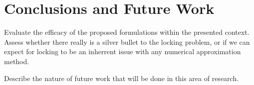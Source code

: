 \chapter{Conclusions and Future Work} \label{ch:future_work}
%
Evaluate the efficacy of the proposed formulations within the presented context. Assess whether there really is a silver bullet to the locking problem, or if we can expect for locking to be an inherrent issue with any numerical approximation method.

Describe the nature of future work that will be done in this area of research.
